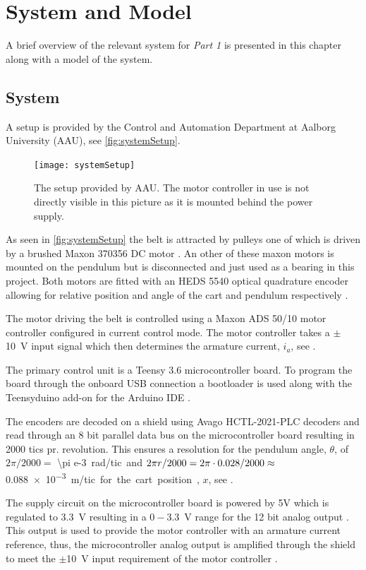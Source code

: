 \chapter{System and Model}
A brief overview of the relevant system for \textit{Part 1} is presented in this chapter along with a model of the system.

\section{System}
A setup is provided by the Control and Automation Department at Aalborg University (AAU), see \autoref{fig:systemSetup}.

\begin{figure}[H]
  \texttt{[image: systemSetup]}
  \caption{The setup provided by AAU. The motor controller in use is not directly visible in this picture as it is mounted behind the power supply.}
  \label{fig:systemSetup}
\end{figure}

As seen in \autoref{fig:systemSetup} the belt is attracted by pulleys one of which is driven by a brushed Maxon 370356 DC motor \cite{maxonMotor}. An other of these maxon motors is mounted on the pendulum but is disconnected and just used as a bearing in this project. Both motors are fitted with an HEDS 5540 optical quadrature encoder allowing for relative position and angle of the cart and pendulum respectively \cite{avagoTechnologies}.

The motor driving the belt is controlled using a Maxon ADS 50/10 motor controller configured in current control mode. The motor controller takes a $\pm$\SI{10}{V} input signal which then determines the armature current, $i_a$, see \cite{maxonMotorController}.

The primary control unit is a Teensy 3.6 microcontroller board. To program the board through the onboard USB connection a bootloader is used along with the Teensyduino add-on for the Arduino IDE \cite{sprkfunTeensy}.

The encoders are decoded on a shield using Avago HCTL-2021-PLC decoders and read through an 8 bit parallel data bus on the microcontroller board resulting in 2000 tics pr. revolution. This ensures a resolution for the pendulum angle, $\theta$, of $2\pi/2000=$ \SI{\pi e-3} rad/tic and $2\pi r /2000=\nolinebreak 2\pi\cdot 0.028 /2000\approx$ \SI{0.088e-3} m/tic for the cart position, $x$, see \cite{avagoDataSheet}.

The supply circuit on the microcontroller board is powered by 5V which is regulated to \SI{3.3}{V} resulting in a $0-$\SI{3.3}{V} range for the 12 bit analog output \cite{teensyDataSheet}. This output is used to provide the motor controller with an armature current reference, thus, the microcontroller analog output is amplified through the shield to meet the $\pm$\SI{10}{V} input requirement of the motor controller \cite{JHHorgensen}.

